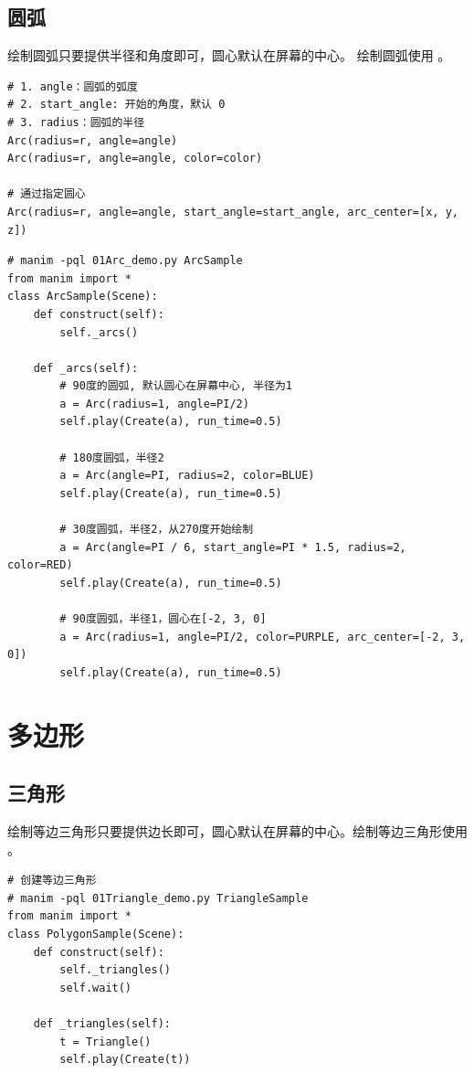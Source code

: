 \subsection{圆弧}
绘制圆弧只要提供半径和角度即可，圆心默认在屏幕的中心。 绘制圆弧使用 。
\begin{lstlisting}[style=demostyle,numbers=none]
# 1. angle：圆弧的弧度
# 2. start_angle: 开始的角度，默认 0
# 3. radius：圆弧的半径    
Arc(radius=r, angle=angle)
Arc(radius=r, angle=angle, color=color)

# 通过指定圆心
Arc(radius=r, angle=angle, start_angle=start_angle, arc_center=[x, y, z])
\end{lstlisting}
\begin{lstlisting}[style=pythonstyle]
# manim -pql 01Arc_demo.py ArcSample    
from manim import *
class ArcSample(Scene):
    def construct(self):
        self._arcs()

    def _arcs(self):
        # 90度的圆弧, 默认圆心在屏幕中心, 半径为1
        a = Arc(radius=1, angle=PI/2)
        self.play(Create(a), run_time=0.5)

        # 180度圆弧，半径2
        a = Arc(angle=PI, radius=2, color=BLUE)
        self.play(Create(a), run_time=0.5)

        # 30度圆弧，半径2，从270度开始绘制
        a = Arc(angle=PI / 6, start_angle=PI * 1.5, radius=2, color=RED)
        self.play(Create(a), run_time=0.5)

        # 90度圆弧，半径1，圆心在[-2, 3, 0]
        a = Arc(radius=1, angle=PI/2, color=PURPLE, arc_center=[-2, 3, 0])
        self.play(Create(a), run_time=0.5)
\end{lstlisting}

\section{多边形}
\subsection{三角形}
绘制等边三角形只要提供边长即可，圆心默认在屏幕的中心。绘制等边三角形使用 。

\begin{lstlisting}[style=pythonstyle]
# 创建等边三角形
# manim -pql 01Triangle_demo.py TriangleSample
from manim import *    
class PolygonSample(Scene):
    def construct(self):
        self._triangles()
        self.wait()

    def _triangles(self):
        t = Triangle()
        self.play(Create(t))
\end{lstlisting}

